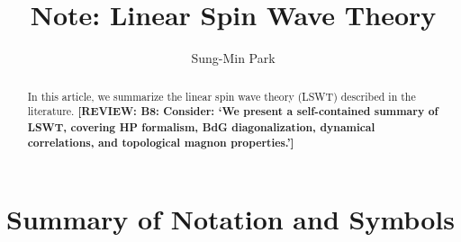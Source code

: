 \documentclass[aps, prx, nofootinbib, superscriptaddress]{revtex4-2}
\newcommand{\REVIEW}[1]{{\color{reviewcolor}\bfseries [REVIEW: #1]}}
\begin{document}
\title{Note: Linear Spin Wave Theory}
\author{Sung-Min Park}
\begin{abstract}
    In this article, we summarize the linear spin wave theory (LSWT) described in the literature.
    \REVIEW{B8: Consider: `We present a self-contained summary of LSWT, covering HP formalism, BdG diagonalization, dynamical correlations, and topological magnon properties.'}
\end{abstract}
\maketitle

\tableofcontents

\newpage
\section*{Summary of Notation and Symbols}
\end{document}
